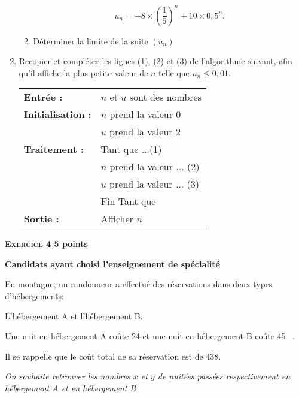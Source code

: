 \documentclass[10pt]{article}
\newcommand{\euro}{\eurologo{}}
\begin{document}
\begin{enumerate}
\begin{enumerate}
\[u_{n} = - 8 \times  \left(\dfrac{1}{5}\right)^n + 10 \times  0,5^n.\]
 
		\item Déterminer la limite de la suite $\left(u_{n}\right)$
	\end{enumerate} 
\item Recopier et compléter les lignes (1), (2) et (3) de l'algorithme suivant, afin qu'il affiche la plus petite valeur de $n$ telle que $u_{n} \leqslant  0,01$.
\begin{center}
\begin{tabularx}{0.6\linewidth}{|l X|} \hline
\textbf{Entrée :}& $n$ et $u$ sont des nombres\\ 
\textbf{Initialisation :}& $n$ prend la valeur 0\\
& $u$ prend la valeur 2\\  
\textbf{Traitement :}&Tant que ...\hfill (1)\\  
	&\hspace{0,5cm} $n$ prend la valeur ... 	\hfill(2)\\ 
	&\hspace{0,5cm} $u$ prend la valeur ... 	\hfill(3)\\ 
&Fin Tant que\\ 
\textbf{Sortie :}&Afficher $n$\\ \hline 
\end{tabularx}
\end{center}
\end{enumerate}

\vspace{0,5cm}

\textbf{\textsc{Exercice 4} \hfill 5 points}
 
\textbf{Candidats ayant  choisi l'enseignement de spécialité}

\medskip 

En montagne, un randonneur a effectué des réservations dans deux types d'hébergements:

L'hébergement A et l'hébergement B.

Une nuit en hébergement A coûte 24 \euro{} et une nuit en  hébergement B coûte 45 ~\euro{}.

Il se rappelle que le coût  total de sa réservation est de 438\euro{}.
 
\emph{On souhaite retrouver les nombres $x$ et $y$ de nuitées passées respectivement en hébergement A et en  hébergement B}

\medskip
 
\end{document}
